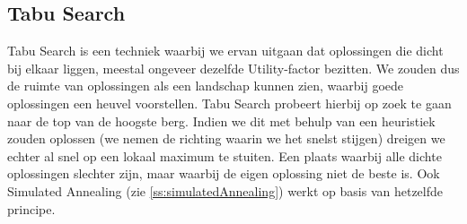 \subsection{Tabu Search}
\label{ss:tabuSearch}
Tabu Search is een techniek waarbij we ervan uitgaan dat oplossingen die dicht bij elkaar liggen, meestal ongeveer dezelfde Utility-factor bezitten. We zouden dus de ruimte van oplossingen als een landschap kunnen zien, waarbij goede oplossingen een heuvel voorstellen. Tabu Search probeert hierbij op zoek te gaan naar de top van de hoogste berg. Indien we dit met behulp van een heuristiek zouden oplossen (we nemen de richting waarin we het snelst stijgen) dreigen we echter al snel op een lokaal maximum te stuiten. Een plaats waarbij alle dichte oplossingen slechter zijn, maar waarbij de eigen oplossing niet de beste is. Ook Simulated Annealing (zie \ref{ss:simulatedAnnealing}) werkt op basis van hetzelfde principe.
